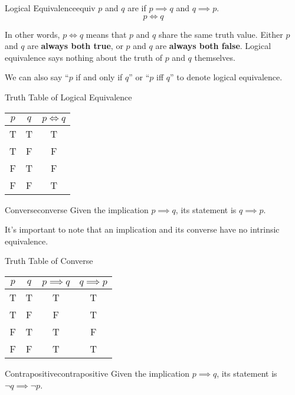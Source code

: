 \begin{dfnbox}{Logical Equivalence}{equiv}
    $p$ and $q$ are  if $p \implies q$ and $q \implies p$.
    \tcblower
    \[ p \iff q \]
\end{dfnbox}

In other words, $p \iff q$ means that $p$ and $q$ share the same truth value. Either $p$ and $q$ are \textbf{always both true}, or $p$ and $q$ are \textbf{always both false}. Logical equivalence says nothing about the truth of $p$ and $q$ themselves.

We can also say ``$p$ if and only if $q$'' or ``$p$ iff $q$'' to denote logical equivalence.

\begin{exbox}{Truth Table of Logical Equivalence}{}
    \begin{center}\begin{tabular}{c | c || c}
        $p$ & $q$ & $p \iff q$ \\ \hline
        T & T & T \\
        T & F & F \\
        F & T & F \\
        F & F & T
    \end{tabular}\end{center}
\end{exbox}

\begin{dfnbox}{Converse}{converse}
    Given the implication $p \implies q$, its  statement is $q \implies p$.
\end{dfnbox}

It's important to note that an implication and its converse have no intrinsic equivalence.


\begin{exbox}{Truth Table of Converse}{}
    \begin{center}\begin{tabular}{c | c || c | c}
        $p$ & $q$ & $p \implies q$ & $q \implies p$ \\ \hline
        T & T & T & T \\
        T & F & F & T \\
        F & T & T & F \\
        F & F & T & T
    \end{tabular}\end{center}
\end{exbox}

\begin{dfnbox}{Contrapositive}{contrapositive}
    Given the implication $p \implies q$, its  statement is $\neg q \implies \neg p$.
\end{dfnbox}

